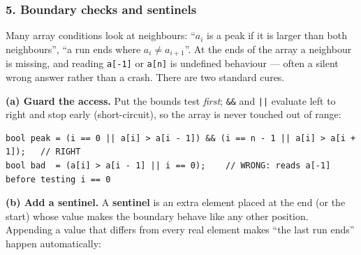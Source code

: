 \subsubsection*{5. Boundary checks and sentinels}

Many array conditions look at neighbours: ``$a_i$ is a peak if it is larger than both neighbours'', ``a run ends where $a_i \ne a_{i+1}$''. At the ends of the array a neighbour is missing, and reading \texttt{a[-1]} or \texttt{a[n]} is undefined behaviour --- often a silent wrong answer rather than a crash. There are two standard cures.

\textbf{(a) Guard the access.} Put the bounds test \emph{first}; \texttt{\&\&} and \texttt{||} evaluate left to right and stop early (short-circuit), so the array is never touched out of range:
\begin{lstlisting}[style=snippet]
bool peak = (i == 0 || a[i] > a[i - 1]) && (i == n - 1 || a[i] > a[i + 1]);   // RIGHT
bool bad  = (a[i] > a[i - 1] || i == 0);    // WRONG: reads a[-1] before testing i == 0
\end{lstlisting}

\textbf{(b) Add a sentinel.} A \textbf{sentinel} is an extra element placed at the end (or the start) whose value makes the boundary behave like any other position. Appending a value that differs from every real element makes ``the last run ends'' happen automatically:

\begin{diagrambox}
\end{diagrambox}

